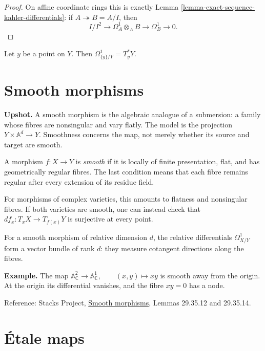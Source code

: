 \begin{proof}
On affine coordinate rings this is exactly
Lemma \ref{lemma-exact-sequence-kahler-differentials}:
if $A\twoheadrightarrow B=A/I$, then
$$
I/I^2\longrightarrow
\Omega^1_A\otimes_A B
\longrightarrow\Omega^1_B\longrightarrow0.
$$
\end{proof}

\begin{corollary}
\label{lemma-cotangent-space-point}
Let $y$ be a point on $Y$.
Then $\Omega^1_{\{y\}/Y}=T_y^\ast Y$.
\end{corollary}

\section{Smooth morphisms}
\label{section-smooth-morphisms}

\noindent
{\bf Upshot.}
A smooth morphism is the algebraic
analogue of a submersion: a family whose
fibres are nonsingular and vary flatly.
The model is the projection
$
Y\times\mathbb{A}^d\longrightarrow Y.
$
Smoothness concerns the map, not merely
whether its source and target are smooth.

\begin{definition}
\label{definition-smooth-morphism}
A morphism $f:X\to Y$ is {\it smooth}
if it is locally of finite presentation,
flat, and has geometrically regular
fibres. The last condition means that
each fibre remains regular after every
extension of its residue field.
\end{definition}

\noindent
For morphisms of complex varieties, this
amounts to flatness and nonsingular
fibres. If both varieties are smooth,
one can instead check that
$
df_x:T_xX\longrightarrow T_{f(x)}Y
$
is surjective at every point.

For a smooth morphism of relative
dimension $d$, the relative differentials
$\Omega^1_{X/Y}$ form a vector bundle
of rank $d$: they measure cotangent
directions along the fibres.

\medskip\noindent
{\bf Example.}
The map
$
\mathbb{A}^2_{\mathbb{C}}
\longrightarrow\mathbb{A}^1_{\mathbb{C}},
\qquad (x,y)\longmapsto xy
$
is smooth away from the origin.
At the origin its differential vanishes,
and the fibre $xy=0$ has a node.

\medskip\noindent
Reference: Stacks Project,
\href{https://stacks.math.columbia.edu/%
tag/01V4}{Smooth morphisms},
Lemmas 29.35.12 and 29.35.14.

\section{Étale maps}
\label{section-etale-maps}

